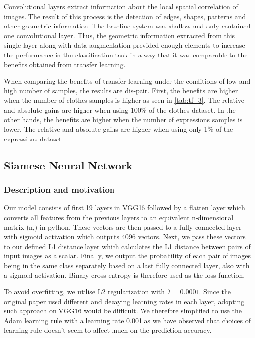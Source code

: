 \documentclass{article}
\begin{document}
Convolutional layers extract information about the local spatial correlation of images. The result of this process is the detection of edges, shapes, patterns and other geometric information. The baseline system was shallow and only contained one convolutional layer. Thus, the geometric information extracted from this single layer along with data augmentation provided enough elements to increase the performance in the classification task in a way that it was comparable to the benefits obtained from transfer learning. 

When comparing the benefits of transfer learning under the conditions of low and high number of samples, the results are dis-pair. First, the benefits are higher when the number of clothes samples is higher as seen in \ref{tab:tf_3}. The relative and absolute gains are higher when using 100\% of the clothes dataset. In the other hands, the benefits are higher when the number of expressions samples is lower. The relative and absolute gains are higher when using only 1\% of the expressions dataset.

\subsection{Siamese Neural Network}

\subsubsection{\textbf{Description and motivation}}

Our model consists of first 19 layers in VGG16 followed by a flatten layer which converts all features from the previous layers to
an equivalent n-dimensional matrix (n,) in python. These vectors are then passed to a fully connected layer with sigmoid activation which outputs 4096 vectors. Next, we pass these vectors to our defined L1 distance layer which calculates the L1 distance between pairs of input images as a scalar. Finally, we output the probability of each pair of images being in the same class separately based on a last fully connected layer, also with a sigmoid activation. Binary cross-entropy is therefore used as the loss function.

To avoid overfitting, we utilise L2 regularization with $\lambda=0.0001$. Since the original paper used different and decaying learning rates in each layer, adopting such approach on VGG16 would be difficult. We therefore simplified to use the Adam learning rule with a learning rate 0.001 as we have observed that choices of learning rule doesn't seem to affect much on the prediction accuracy.
\end{document}
